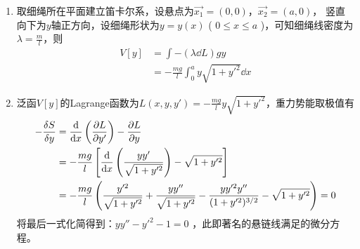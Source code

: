 \begin{solution}
    \begin{enumerate}[label=(\arabic*)]
        \item 取细绳所在平面建立笛卡尔系，设悬点为\( \vec{x_1}=(0,0) \)，\( \vec{x_2}=(a,0) \)，
        竖直向下为\(y\)轴正方向，设细绳形状为\( y=y(x) \) ( \( 0 \leq x \leq a \) )，可知细绳线密度为\( \lambda = \frac{m}{l} \)，则
        \[
        \begin{aligned}
            V[y] &= \int -(\lambda \dd L) gy \\
                 &= -\frac{mg}{l} \int_0^a y\sqrt{1+y'^2} \dd x
        \end{aligned}
        \]
        \item 泛函\(V[y]\)的Lagrange函数为\( L(x,y,y')=-\frac{mg}{l}y\sqrt{1+y'^2} \)，重力势能取极值有
        \[
        \begin{aligned}
            -\frac{\delta S}{\delta y} &= \frac{\dd}{\dd x} \left( \frac{\partial L}{\partial y'} \right) - \frac{\partial L}{\partial y} \\
                                 &= -\frac{mg}{l} \left[  
                                 \frac{\dd}{\dd x} \left( \frac{yy'}{\sqrt{1+y'^2}} \right) - \sqrt{1+y'^2} 
                                 \right] \\
                                 &= -\frac{mg}{l} \left( 
                                 \frac{y'^2}{\sqrt{1+y'^2}} + \frac{yy''}{\sqrt{1+y'^2}} - \frac{yy'^2y''}{ (1+y'^2)^{3/2} } - \sqrt{1+y'^2} 
                                 \right) = 0
        \end{aligned}
        \]
        将最后一式化简得到：\( yy'' - y'^2 - 1 = 0 \) ，此即著名的悬链线满足的微分方程。
    \end{enumerate}
\end{solution}


